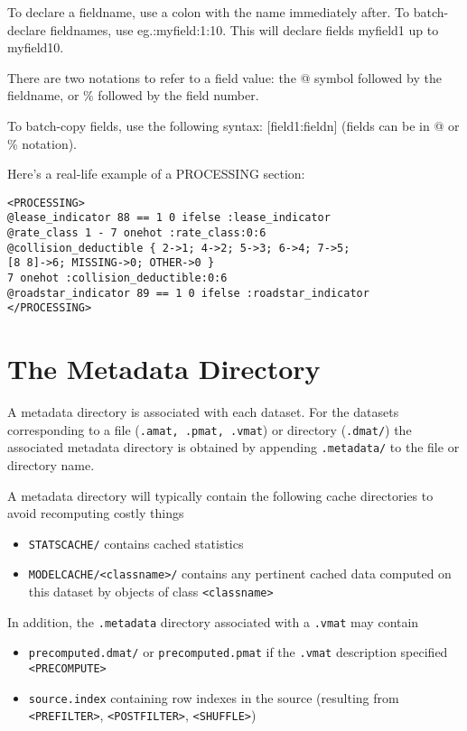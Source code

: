 \documentclass[11pt]{book}
\begin{document}
To declare a fieldname, use a colon with the name immediately after. To batch-declare fieldnames, use eg.:myfield:1:10. This will declare fields myfield1 up to myfield10.

There are two notations to refer to a field value: the @ symbol followed by the fieldname, or \% followed by the field number.

To batch-copy fields, use the following syntax: [field1:fieldn] (fields can be in @ or \% notation).

Here's a real-life example of a PROCESSING section:

\begin{verbatim}
<PROCESSING>
@lease_indicator 88 == 1 0 ifelse :lease_indicator
@rate_class 1 - 7 onehot :rate_class:0:6
@collision_deductible { 2->1; 4->2; 5->3; 6->4; 7->5; 
[8 8]->6; MISSING->0; OTHER->0 }
7 onehot :collision_deductible:0:6
@roadstar_indicator 89 == 1 0 ifelse :roadstar_indicator
</PROCESSING>
\end{verbatim}

\section{The Metadata Directory}

A metadata directory is associated with each dataset.  For the datasets
corresponding to a file ({\tt .amat, .pmat, .vmat}) or directory ({\tt .dmat/}) the
associated metadata directory is obtained by appending {\tt .metadata/} to the
file or directory name.

A metadata directory will typically contain the following cache directories to avoid recomputing costly things

\begin{itemize}
\item \verb!STATSCACHE/! contains cached statistics
\item \verb!MODELCACHE/<classname>/! contains any pertinent cached data computed on this dataset by objects of class \verb!<classname>!
\end{itemize}

In addition, the {\tt .metadata} directory associated with a {\tt .vmat} may contain
\begin{itemize}
\item {\tt precomputed.dmat/} or {\tt precomputed.pmat} if the {\tt .vmat} description specified \verb!<PRECOMPUTE>!
\item {\tt source.index} containing row indexes in the source (resulting from \verb!<PREFILTER>!, \verb!<POSTFILTER>!, \verb!<SHUFFLE>!)
\end{itemize}
\end{document}
